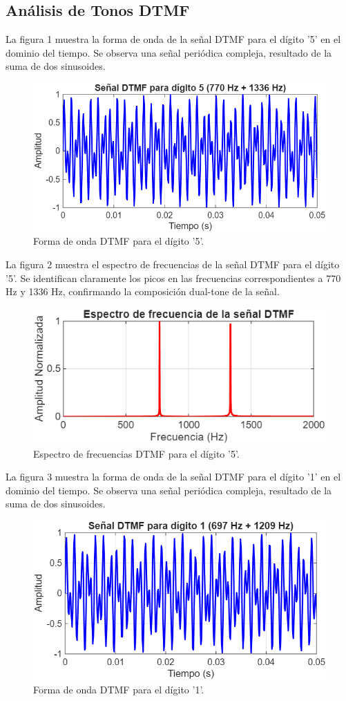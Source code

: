 \documentclass[journal]{IEEEtran} %
\begin{document}
\subsection{Análisis de Tonos DTMF}\label{AA}
La figura 1 muestra la forma de onda de la señal DTMF para el dígito '5' en el dominio del tiempo. Se observa una señal periódica compleja, resultado de la suma de dos sinusoides.
\begin{figure}[htbp]
    \centerline{\includegraphics[width=0.8\columnwidth]{Figure_1.png}}
    \caption{Forma de onda DTMF para el dígito '5'.}
    \label{fig}
\end{figure}


La figura 2 muestra el espectro de frecuencias de la señal DTMF para el dígito '5'. Se identifican claramente los picos en las frecuencias correspondientes a 770 Hz y 1336 Hz, confirmando la composición dual-tone de la señal.
\begin{figure}[htbp]
    \centerline{\includegraphics[width=0.8\columnwidth]{Figure_2.png}}
    \caption{Espectro de frecuencias DTMF para el dígito '5'.}
    \label{fig}
\end{figure}

La figura 3 muestra la forma de onda de la señal DTMF para el dígito '1' en el dominio del tiempo. Se observa una señal periódica compleja, resultado de la suma de dos sinusoides.
\begin{figure}[htbp]
    \centerline{\includegraphics[width=0.8\columnwidth]{Figure_3.png}}
    \caption{Forma de onda DTMF para el dígito '1'.}
    \label{fig}
\end{figure}
\end{document}
